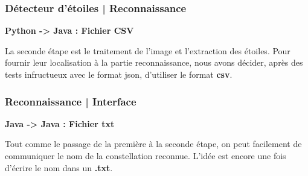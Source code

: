 \subsubsection{Détecteur d'étoiles | Reconnaissance}

\noindent \textbf{Python -> Java : Fichier CSV}

\vspace{0.2cm}

\noindent La seconde étape est le traitement de l'image et l'extraction des étoiles. Pour fournir leur localisation à la partie reconnaissance, nous avons décider, après des tests infructueux avec le format json, d'utiliser le format \textbf{csv}.

\subsubsection{Reconnaissance | Interface}

\noindent \textbf{Java -> Java : Fichier txt}

\vspace{0.2cm}

\noindent Tout comme le passage de la première à la seconde étape, on peut facilement de communiquer le nom de la constellation reconnue. L'idée est encore une fois d'écrire le nom dans un \textbf{.txt}.
